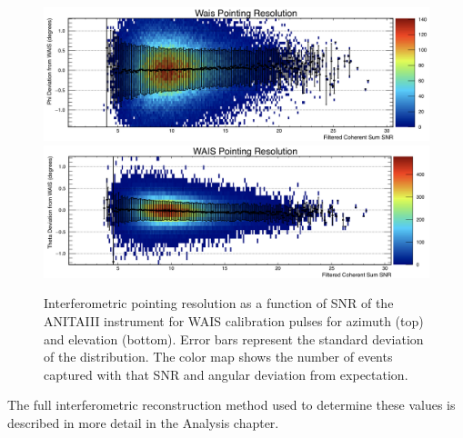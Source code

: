 	\begin{figure}
	\label{fig:pointingAccuracy}
		\centering
		\includegraphics[width=\textwidth]{figures/waisPhiResolution}
		\includegraphics[width=\textwidth]{figures/waisThetaResolution}	
		\caption{Interferometric pointing resolution as a function of SNR of the ANITAIII instrument for WAIS calibration pulses for azimuth (top) and elevation (bottom).  Error bars represent the standard deviation of the distribution.  The color map shows the number of events captured with that SNR and angular deviation from expectation.}
	\end{figure}
	
	The full interferometric reconstruction method used to determine these values is described in more detail in the Analysis chapter.
	
